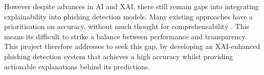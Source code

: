 \noindent However despite advances in AI and XAI, there still remain gaps into integrating explainability into phishing detection models. Many existing approaches have a prioritisation on accuracy, without much thought for comprehensability \citep{hernandes2021phishing}. This means its difficult to strike a balance between performance and transparency. This project therefore addresses to seek this gap, by developing an XAI-enhanced phishing detection system that achieves a high accuracy whilst providing actionable explanations behind its predictions.
